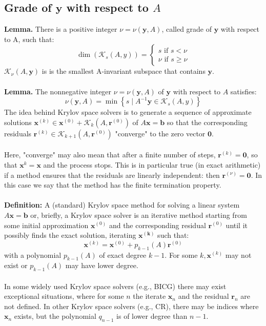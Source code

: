 \documentclass[11pt]{book}
\begin{document}
\subsection*{Grade of $\mathbf{y}$ with respect to $A$}
\textbf{Lemma.} There is a positive integer $\nu=\nu(\mathbf{y}, A)$, called grade of $\mathbf{y}$ with respect to $\mathrm{A}$, such that:
$$
\operatorname{dim}\left(\mathscr{K}_{s}(A, y)\right)=\left\{\begin{array}{l}
s \text { if } s < \nu \\
\nu \text { if } s \geq \nu
\end{array}\right.
$$
$\mathscr{K}_{\nu}(A, \mathbf{y})$ is is the smallest $\mathrm{A}$-invariant subspace that contains $\mathbf{y}$.\\ \\
\textbf{Lemma.} The nonnegative integer $\nu=\nu(\mathbf{y}, A)$ of $\mathbf{y}$ with respect to $A$ satisfies:
$$
\nu(\mathbf{y}, A)=\min \left\{s \mid A^{-1} \mathbf{y} \in \mathscr{K}_{s}(A, y)\right\}
$$
The idea behind Krylov space solvers is to generate a sequence of approximate solutions $\mathbf{x}^{(k)} \in \mathbf{x}^{(0)}+\mathscr{K}_{k}\left(A, \mathbf{r}^{(0)}\right)$ of $A \mathbf{x}=\mathbf{b}$ so that the corresponding residuals $\mathbf{r}^{(k)} \in \mathscr{K}_{k+1}\left(A, \mathbf{r}^{(0)}\right)$ "converge" to the zero vector $\mathbf{0}$.\\ \\
Here, "converge" may also mean that after a finite number of steps, $\mathbf{r}^{(k)}=\mathbf{0}$, so that $\mathbf{x}^{k}=\mathbf{x}$ and the process stops. This is in particular true (in exact arithmetic) if a method ensures that the residuals are linearly independent: then $\mathbf{r}^{(\nu)}=\mathbf{0}$. In this case we say that the method has the finite termination property.\\ \\
\textbf{Definition:} A (standard) Krylov space method for solving a linear system $A \mathbf{x}=\mathbf{b}$ or, briefly, a Krylov space solver is an iterative method starting from some initial approximation $\mathbf{x}^{(0)}$ and the corresponding residual $\mathbf{r}^{(0)}$ until it possibly finds the exact solution, iterating $\mathbf{x}^{(\mathbf{k})}$ such that:
$$
\mathbf{x}^{(k)}=\mathbf{x}^{(0)}+p_{k-1}(A) \mathbf{r}^{(0)}
$$
with a polynomial $p_{k-1}(A)$ of exact degree $k-1$. For some $k, \mathbf{x}^{(k)}$ may not exist or $p_{k-1}(A)$ may have lower degree.\\ \\
In some widely used Krylov space solvers (e.g., BICG) there may exist exceptional situations, where for some $n$ the iterate $\mathbf{x}_n$ and the residual $\mathbf{r}_n$ are not defined. In other Krylov space solvers (e.g., CR), there may be indices where $\mathbf{x}_n$ exists, but the polynomial $q_{n-1}$ is of lower degree than $n-1$.
\end{document}
